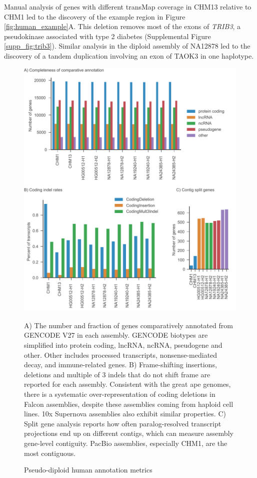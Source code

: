\documentclass[fleqn,10pt]{wlscirep}
\begin{document}
Manual analysis of genes with different transMap coverage in CHM13 relative to CHM1 led to the discovery of the example region in Figure \ref{fig:human_example}A. This deletion removes most of the exons of \textit{TRIB3}, a pseudokinase associated with type 2 diabetes \cite{shi2009association} (Supplemental Figure \ref{supp_fig:trib3}). Similar analysis in the diploid assembly of NA12878 led to the discovery of a tandem duplication involving an exon of TAOK3 in one haplotype.

\begin{figure}
\centering
\includegraphics[width=\textwidth,height=0.75\textheight,keepaspectratio]{human-metrics.pdf}
\caption{Pseudo-diploid human annotation metrics}
A) The number and fraction of genes comparatively annotated from GENCODE V27 in each assembly. GENCODE biotypes are simplified into protein coding, lncRNA, ncRNA, pseudogene and other. Other includes processed transcripts, nonsense-mediated decay, and immune-related genes. B) Frame-shifting insertions, deletions and multiple of 3 indels that do not shift frame are reported for each assembly. Consistent with the great ape genomes, there is a systematic over-representation of coding deletions in Falcon assemblies, despite these assemblies coming from haploid cell lines. 10x Supernova assemblies also exhibit similar properties. C) Split gene analysis reports how often paralog-resolved transcript projections end up on different contigs, which can measure assembly gene-level contiguity. PacBio assemblies, especially CHM1, are the most contiguous.
\label{fig:human_metrics}
\end{figure}
\end{document}
